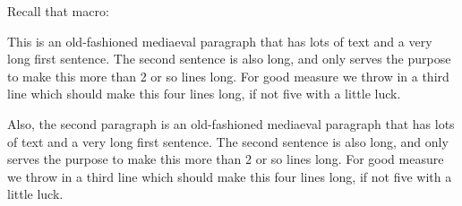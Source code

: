 Recall that macro:

\begin{examplewithcode}

\begin{minipage}[t]{3in}
\def\biginitial#1{\hskip-20pt \Hang{\huge #1}\hskip 20pt}
\parindent=0pt

\everypar{\hangafter=-2 \hangindent=20pt \biginitial}
This is an old-fashioned mediaeval paragraph that has lots of text and
a very long first sentence. The second sentence is also long, and only
serves the purpose to make this more than 2 or so lines long. For good
measure we throw in a third line which should make this four lines
long, if not five with a little luck.

Also, the second paragraph is an old-fashioned mediaeval paragraph that
has lots of text and a very long first sentence. The second sentence
is also long, and only serves the purpose to make this more than 2 or
so lines long. For good measure we throw in a third line which should
make this four lines long, if not five with a little luck.
\end{minipage}
\end{examplewithcode}
